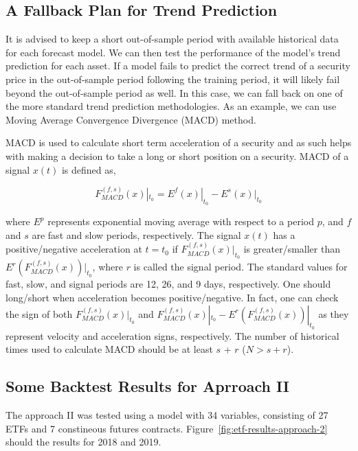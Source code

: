 \documentclass{article}
\begin{document}
\subsection{A Fallback Plan for Trend Prediction}\label{subsection:fallback-macd}

It is advised to keep a short out-of-sample period with available
historical data for each forecast model. We can then test the
performance of the model's trend prediction for each asset. If a model
fails to predict the correct trend of a security price in the
out-of-sample period following the training period, it will likely
fail beyond the out-of-sample period as well. In this case, we can
fall back on one of the more standard trend prediction
methodologies. As an example, we can use Moving Average Convergence
Divergence (MACD) method.

MACD is used to calculate short term acceleration of a security and as
such helps with making a decision to take a long or short position on
a security. MACD of a signal $x(t)$ is defined as,

\begin{equation}\label{eqn:macd}
F_{MACD}^{(f,s)}(x)|_{t_{0}} = E^{f}(x)|_{t_{0}} -
E^{s}(x)|_{t_{0}}
\end{equation}

where $E^{p}$ represents exponential moving average with respect to a
period $p$, and $f$ and $s$ are fast and slow periods,
respectively. The signal $x(t)$ has a positive/negative acceleration
at $t=t_{0}$ if $F_{MACD}^{(f,s)}(x)|_{t_{0}}$ is
greater/smaller than $E^{r}(F_{MACD}^{(f,s)}(x))|_{t_{0}}$, where
$r$ is called the signal period. The standard values for fast, slow,
and signal periods are 12, 26, and 9 days, respectively. One should
long/short when acceleration becomes positive/negative. In fact, one
can check the sign of both $F_{MACD}^{(f,s)}(x)|_{t_{0}}$ and
$F_{MACD}^{(f,s)}(x)|_{t_{0}}-E^{r}(F_{MACD}^{(f,s)}(x))|_{t_{0}}$
as they represent velocity and acceleration signs, respectively. The
number of historical times used to calculate MACD should be at least
$s$ + $r$ ($N > s + r$).

\subsection{Some Backtest Results for Aprroach II}\label{subsection:fallback-macd}

The approach II was tested using a model with 34 variables, consisting
of 27 ETFs and 7 constineous futures
contracts. Figure~\ref{fig:etf-results-approach-2} should the results
for 2018 and 2019.
\end{document}
